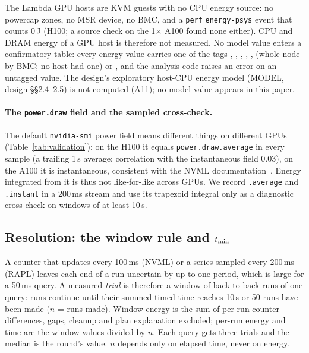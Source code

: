 \documentclass[sigconf]{acmart}
\begin{document}
The Lambda GPU hosts are KVM guests with no CPU energy source: no powercap zones, no MSR device,
no BMC, and a \texttt{perf} \texttt{energy-psys} event that counts 0\,J (H100; a source check on
the 1$\times$ A100 found none either). CPU and DRAM energy of a GPU host is therefore not measured.
No model value enters a confirmatory table: every energy value carries one of the tags
, , , , ,
 (whole node by BMC; no host had one) or , and the analysis code raises an
error on an untagged value. The design's exploratory host-CPU energy model (MODEL, design
\S\S2.4--2.5) is not computed (A11); no model value appears in this paper.

\paragraph{The \texttt{power.draw} field and the sampled cross-check.}
The default \texttt{nvidia-smi} power field means different things on different GPUs
(Table~\ref{tab:validation}): on the H100 it equals \texttt{power.draw.average} in every sample
(a trailing 1\,s average; correlation with the instantaneous field 0.03), on the A100 it is
instantaneous, consistent with the NVML documentation~\cite{nvml_api}. Energy integrated from it
is thus not like-for-like across GPUs. We record \texttt{.average} and \texttt{.instant} in a
200\,ms stream and use its trapezoid integral only as a diagnostic cross-check on windows of at
least 10\,s.

\subsection{Resolution: the window rule and \texorpdfstring{$t_{\min}$}{t\_min}}
\label{sec:resolution}
A counter that updates every 100\,ms (NVML) or a series sampled every 200\,ms (RAPL) leaves each
end of a run uncertain by up to one period, which is large for a 50\,ms query. A measured
\emph{trial} is therefore a window of back-to-back runs of one query: runs continue until their
summed timed time reaches 10\,s or 50 runs have been made ($n$ = runs made). Window energy is the
sum of per-run counter differences, gaps, cleanup and plan explanation excluded; per-run energy
and time are the window values divided by $n$. Each query gets three trials and the median is the
round's value. $n$ depends only on elapsed time, never on energy.
\end{document}
